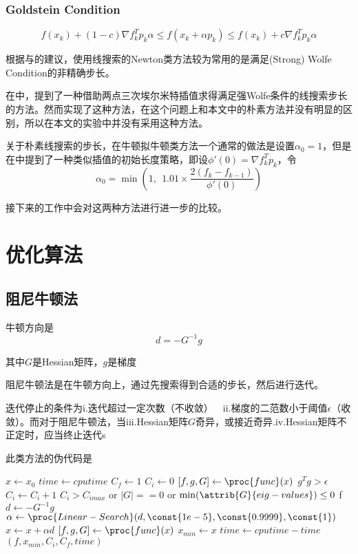 \documentclass[11pt, a4paper]{article}
\begin{document}
\subsubsection{Goldstein Condition}
\[f(x_k)+(1-c)\nabla f_k^Tp_k\alpha \le f(x_k+\alpha p_k)\le f(x_k)+c\nabla f_k^T p_k\alpha\]


根据\cite{shanno1970conditioning}与\cite{ZHANG2001269}的建议，使用线搜索的Newton类方法较为常用的是满足(Strong) Wolfe Condition的非精确步长。

在\cite{Nocedal2006NO}中，提到了一种借助两点三次埃尔米特插值求得满足强Wolfe条件的线搜索步长的方法。然而\cite{ding2005investigation}实现了这种方法，在这个问题上和本文中的朴素方法并没有明显的区别，所以在本文的实验中并没有采用这种方法。

关于朴素线搜索的步长，在牛顿拟牛顿类方法一个通常的做法是设置$\alpha_0=1$，但是在\cite{Nocedal2006NO}中提到了一种类似插值的初始长度策略，即设$\phi'(0)=\nabla f_k^Tp_k$，令
\[\alpha_0=\min\left(1,~~1.01\times \frac{2(f_k-f_{k-1})}{\phi'(0)}\right)\]

接下来的工作中会对这两种方法进行进一步的比较。

\section{优化算法}

\subsection{阻尼牛顿法}

牛顿方向是\[d=-G^{-1}g\]

其中$G$是Hessian矩阵，$g$是梯度

阻尼牛顿法是在牛顿方向上，通过先搜索得到合适的步长，然后进行迭代。

迭代停止的条件为i.迭代超过一定次数（不收敛）~~ii.梯度的二范数小于阈值$\epsilon$（收敛）。而对于阻尼牛顿法，当iii.Hessian矩阵$G$奇异，或接近奇异.iv.Hessian矩阵不正定时，应当终止迭代s

此类方法的伪代码是

\begin{codebox}
	\li $x\gets x_0$
	\li $time\gets cputime$
	\li $C_f\gets 1$
	\li $C_i\gets 0$
	\li $[f,g,G]\gets \proc{func}(x)$
	\li \While $g^Tg>\epsilon$ 
		\Do
	\li 	$C_i\gets C_i+1$
	\li 	\If $C_i>C_{imax}$ or $|G|==0$ or $\min (\attrib{G}{eig-values})\le0$
	\li			\Then \Return f
			\End
	\li		$d\gets -G^{-1}g$
	\li 	$\alpha\gets\proc{Linear-Search}(d,\const{1e-5},\const{0.9999},\const{1})$
	\li 	$x\gets x+\alpha d$
	\li 	$[f,g,G]\gets\proc{func}(x)$
		\End
	\li $x_{min}\gets x$
	\li $time\gets cputime-time$
	\li \Return $(f,x_{min},C_i,C_f,time)$
\end{codebox}
\end{document}
